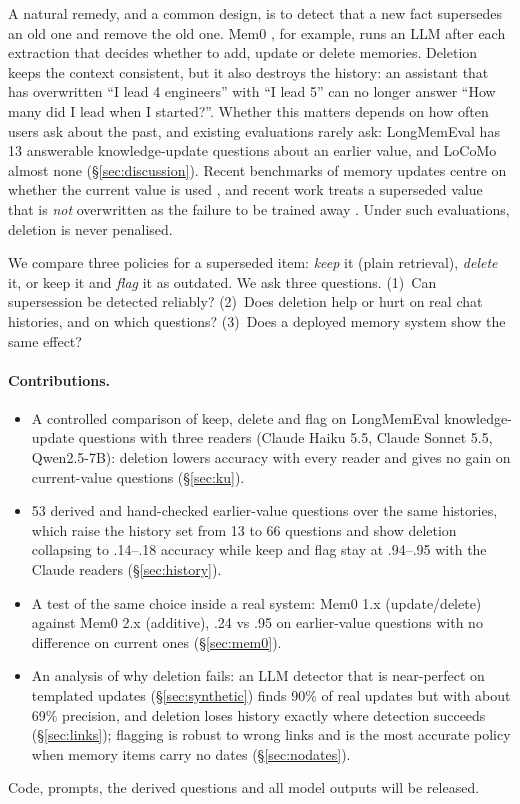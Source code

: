 \documentclass[11pt]{article}
\begin{document}
A natural remedy, and a common design, is to detect that a new fact supersedes an old one and remove
the old one. Mem0 \citep{chhikara2025mem0}, for example, runs an LLM after each extraction that
decides whether to add, update or delete memories. Deletion keeps the context consistent, but it also
destroys the history: an assistant that has overwritten ``I lead 4 engineers'' with ``I lead 5'' can no
longer answer ``How many did I lead when I started?''. Whether this matters depends on how often users
ask about the past, and existing evaluations rarely ask: LongMemEval has 13 answerable knowledge-update
questions about an earlier value, and LoCoMo almost none (\S\ref{sec:discussion}). Recent
benchmarks of memory updates centre on whether the current value is used
\citep{hu2026memoryagentbench,chao2026stale,uddin2026memora,fan2026statemem}, and recent work treats
a superseded value that is \emph{not} overwritten as the failure to be trained away
\citep{patel2026supersede}. Under such evaluations, deletion is never penalised.

We compare three policies for a superseded item: \emph{keep} it (plain retrieval), \emph{delete} it,
or keep it and \emph{flag} it as outdated. We ask three questions. (1)~Can supersession be detected
reliably? (2)~Does deletion help or hurt on real chat histories, and on which questions? (3)~Does a
deployed memory system show the same effect?

\paragraph{Contributions.}
\begin{itemize}
\setlength\itemsep{0pt}
\item A controlled comparison of keep, delete and flag on LongMemEval knowledge-update questions with
three readers (Claude Haiku 5.5, Claude Sonnet 5.5, Qwen2.5-7B): deletion lowers accuracy with every
reader and gives no gain on current-value questions (\S\ref{sec:ku}).
\item 53 derived and hand-checked earlier-value questions over the same histories, which raise the history set from 13
to 66 questions and show deletion collapsing to .14--.18 accuracy while keep and flag stay at
.94--.95 with the Claude readers (\S\ref{sec:history}).
\item A test of the same choice inside a real system: Mem0 1.x (update/delete) against Mem0 2.x
(additive), .24 vs .95 on earlier-value questions with no difference on current ones
(\S\ref{sec:mem0}).
\item An analysis of why deletion fails: an LLM detector that is near-perfect on templated updates
(\S\ref{sec:synthetic}) finds 90\% of real updates but with about 69\% precision, and deletion loses
history exactly where detection succeeds (\S\ref{sec:links}); flagging is robust to wrong links and is
the most accurate policy when memory items carry no dates (\S\ref{sec:nodates}).
\end{itemize}
Code, prompts, the derived questions and all model outputs will be released.
\end{document}
